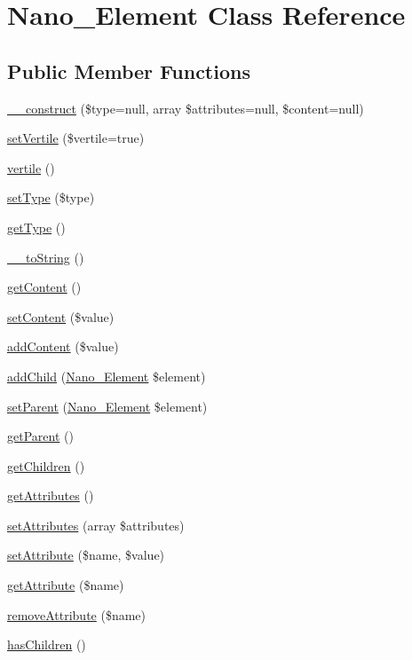 \hypertarget{classNano__Element}{
\section{Nano\_\-Element Class Reference}
\label{classNano__Element}
}
\subsection*{Public Member Functions}
\begin{CompactItemize}
\item 
\hyperlink{classNano__Element_f49062d718c493501fca741e0f6bd341}{\_\-\_\-construct} (\$type=null, array \$attributes=null, \$content=null)
\item 
\hyperlink{classNano__Element_0249d33d64a9fd3945973948c6e06e67}{setVertile} (\$vertile=true)
\item 
\hyperlink{classNano__Element_95bdea0f50dd6b8d7c342a4bf49e2d65}{vertile} ()
\item 
\hyperlink{classNano__Element_9da93bea03707e2dd3ad66d59fd123cc}{setType} (\$type)
\item 
\hyperlink{classNano__Element_6be26fe815b90d45ab8a7388b95dec1d}{getType} ()
\item 
\hyperlink{classNano__Element_8981fda3d44381f41e2d2592f3676cb0}{\_\-\_\-toString} ()
\item 
\hyperlink{classNano__Element_3d6aabd33be2134dea635e4a2f11b3a0}{getContent} ()
\item 
\hyperlink{classNano__Element_980d19959ac9226ef6acd52e45981b10}{setContent} (\$value)
\item 
\hyperlink{classNano__Element_b0692ee2c5043aace23f6840a9aa4c01}{addContent} (\$value)
\item 
\hyperlink{classNano__Element_1b73a03b9a500111184ece0c86f0724e}{addChild} (\hyperlink{classNano__Element}{Nano\_\-Element} \$element)
\item 
\hyperlink{classNano__Element_537cf639f9d4b8a0fb23bdd985a49d5c}{setParent} (\hyperlink{classNano__Element}{Nano\_\-Element} \$element)
\item 
\hyperlink{classNano__Element_d70f129fa04d461c9366b3abb21dc5ee}{getParent} ()
\item 
\hyperlink{classNano__Element_7be19ec6d4f9dda74fc5cfbe9ebdb16b}{getChildren} ()
\item 
\hyperlink{classNano__Element_20becc6fa536113b9010c5c9653f1a5d}{getAttributes} ()
\item 
\hyperlink{classNano__Element_9df5d74de5bca50f4bc1accea9115a72}{setAttributes} (array \$attributes)
\item 
\hyperlink{classNano__Element_b920cd8b528d2b169090187b2b6b97f2}{setAttribute} (\$name, \$value)
\item 
\hyperlink{classNano__Element_b65243363b3fc22049a6422314248557}{getAttribute} (\$name)
\item 
\hyperlink{classNano__Element_704dbfc8d84ff8c1d98c76449350ad90}{removeAttribute} (\$name)
\item 
\hyperlink{classNano__Element_299b186295e1a27a4f42d02c92e4bd92}{hasChildren} ()
\end{CompactItemize}
